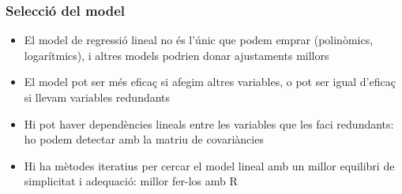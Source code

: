 \documentclass[12pt,t]{beamer}
\theoremstyle{plain}
\theoremstyle{definition}
\begin{document}
%
%
%
%
%
%

\begin{frame}
\frametitle{Selecció del model}
\begin{itemize}

\item El model de regressió lineal no és l'únic que podem emprar (polinòmics, logarítmics), i altres models podrien donar ajustaments millors
\medskip

\item El model pot ser més eficaç si afegim altres variables, o pot ser igual d'eficaç si llevam variables redundants
\medskip

\item Hi pot haver dependències lineals entre les variables que les faci redundants: ho podem detectar amb la matriu de covariàncies
\medskip

\item Hi ha mètodes iteratius per cercar el model lineal amb un millor equilibri de simplicitat i adequació: millor fer-los amb R
\end{itemize}

\end{frame}
\end{document}
